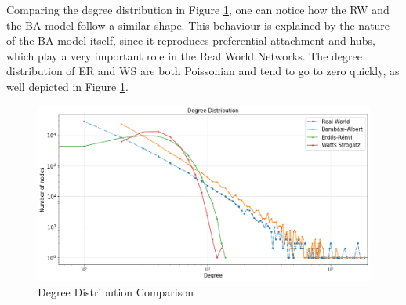 \documentclass[sigchi]{acmart}
\begin{document}
\begin{table}[h]
    \centering
        \caption{Characterization of RW and Simulated Networks. It shows number of Nodes, number of Edges, Average Degree (Degree), Density, Average Clustering Coefficient (AClCo) and Average Path Length (APL).}
    \label{tab:proper}
\end{table}

Comparing the degree distribution in Figure \ref{fig:degree_distribution_comparison}, one can notice how the RW and the BA model follow a similar shape. This behaviour is explained by the nature of the BA model itself, since it reproduces preferential attachment and hubs, which play a very important role in the Real World Networks. 
The degree distribution of ER and WS are both Poissonian and tend to go to zero quickly, as well depicted in Figure \ref{fig:degree_distribution_comparison}.

\begin{figure}[h]
    \centering
    \includegraphics[width=0.8\columnwidth]{report/img/Degree_distribution_comparison.png}
    \caption{Degree Distribution Comparison}
    \label{fig:degree_distribution_comparison}
\end{figure}
\end{document}
